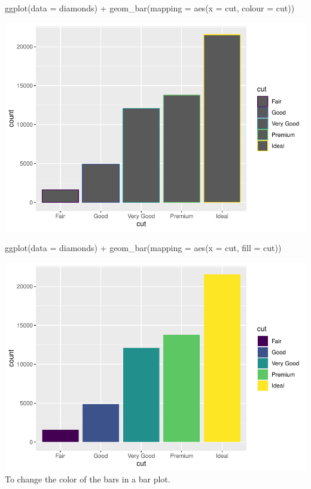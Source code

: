\documentclass[
]{article}
\newenvironment{Shaded}{\begin{snugshade}}{\end{snugshade}}
\newcommand{\AttributeTok}[1]{\textcolor[rgb]{0.77,0.63,0.00}{#1}}
\newcommand{\FunctionTok}[1]{\textcolor[rgb]{0.00,0.00,0.00}{#1}}
\newcommand{\NormalTok}[1]{#1}
\newcommand{\SpecialCharTok}[1]{\textcolor[rgb]{0.00,0.00,0.00}{#1}}
\begin{document}
\begin{Shaded}
\begin{Highlighting}[]
\FunctionTok{ggplot}\NormalTok{(}\AttributeTok{data =}\NormalTok{ diamonds) }\SpecialCharTok{+} 
  \FunctionTok{geom\_bar}\NormalTok{(}\AttributeTok{mapping =} \FunctionTok{aes}\NormalTok{(}\AttributeTok{x =}\NormalTok{ cut, }\AttributeTok{colour =}\NormalTok{ cut))}
\end{Highlighting}
\end{Shaded}

\includegraphics{Assignments_files/figure-latex/unnamed-chunk-48-1.pdf}

\begin{Shaded}
\begin{Highlighting}[]
\FunctionTok{ggplot}\NormalTok{(}\AttributeTok{data =}\NormalTok{ diamonds) }\SpecialCharTok{+} 
  \FunctionTok{geom\_bar}\NormalTok{(}\AttributeTok{mapping =} \FunctionTok{aes}\NormalTok{(}\AttributeTok{x =}\NormalTok{ cut, }\AttributeTok{fill =}\NormalTok{ cut))}
\end{Highlighting}
\end{Shaded}

\includegraphics{Assignments_files/figure-latex/unnamed-chunk-48-2.pdf}
To change the color of the bars in a bar plot.
\end{document}
